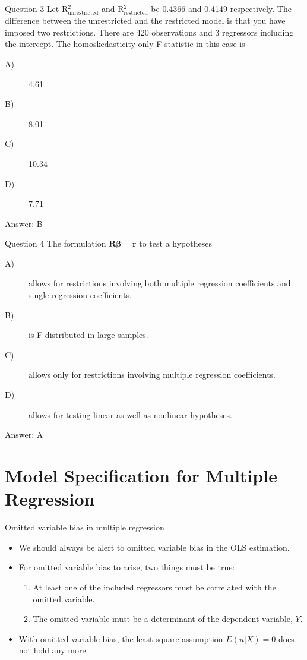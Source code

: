\documentclass[presentation,10pt]{beamer}
\begin{document}
\begin{frame}[label={sec:org70d198c}]{Question 3}
Let R\(^{\text{2}}_{\text{unrestricted}}\) and R\(^{\text{2}}_{\text{restricted}}\) be 0.4366 and 0.4149 respectively. The difference between the unrestricted and the restricted model is that you have imposed two restrictions. There are 420 observations and 3 regressors including the intercept. The homoskedasticity-only F-statistic in this case is
\begin{description}
\item[{A)}] 4.61
\item[{B)}] 8.01
\item[{C)}] 10.34
\item[{D)}] 7.71
\end{description}
\pause
Answer:  B
\end{frame}

\begin{frame}[label={sec:org75b5960}]{Question 4}
The formulation \(\boldsymbol{R\beta} = \boldsymbol{r}\) to test a hypotheses
\begin{description}
\item[{A)}] allows for restrictions involving both multiple regression coefficients and single regression coefficients.
\item[{B)}] is F-distributed in large samples.
\item[{C)}] allows only for restrictions involving multiple regression coefficients.
\item[{D)}] allows for testing linear as well as nonlinear hypotheses.
\end{description}
\pause
Answer:  A
\end{frame}


\section{Model Specification for Multiple Regression}
\label{sec:org1600b91}
\setcounter{tocdepth}{1}
\tableofcontents[currentsection]
\begin{frame}[label={sec:orgf153337}]{Omitted variable bias in multiple regression}
\begin{itemize}
\item We should always be alert to omitted variable bias in the OLS
estimation.

\item For omitted variable bias to arise, two things must be true:
\begin{enumerate}
\item At least one of the included regressors must be correlated with the
omitted variable.
\item The omitted variable must be a determinant of the dependent
variable, \(Y\).
\end{enumerate}

\item With omitted variable bias, the least square assumption \(E(u|X) = 0\)
does not hold any more.
\end{itemize}
\end{frame}
\end{document}
